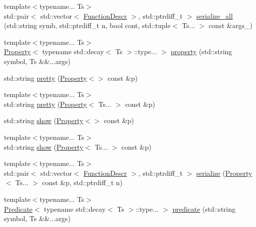 \begin{DoxyCompactItemize}
\item 
{\footnotesize template$<$typename... Ts$>$ }\\std\+::pair$<$ std\+::vector$<$ \hyperlink{structpfq_1_1lang_1_1FunctionDescr}{Function\+Descr} $>$, std\+::ptrdiff\+\_\+t $>$ \hyperlink{namespacepfq_1_1lang_acd7f9c34960d4f3511228a5568628acf}{serialize\+\_\+all} (std\+::string symb, std\+::ptrdiff\+\_\+t n, bool cont, std\+::tuple$<$ Ts... $>$ const \&args\+\_\+)
\item 
{\footnotesize template$<$typename... Ts$>$ }\\\hyperlink{structpfq_1_1lang_1_1Property}{Property}$<$ typename std\+::decay$<$ Ts $>$\+::type... $>$ \hyperlink{namespacepfq_1_1lang_a1249450e72229273b0db707a286aea91}{property} (std\+::string symbol, Ts \&\&...args)
\item 
std\+::string \hyperlink{namespacepfq_1_1lang_ac2521931d090c58e1edaf556692f66d2}{pretty} (\hyperlink{structpfq_1_1lang_1_1Property}{Property}$<$$>$ const \&p)
\item 
{\footnotesize template$<$typename... Ts$>$ }\\std\+::string \hyperlink{namespacepfq_1_1lang_ad72cdee2fca49246a75620232dfe061a}{pretty} (\hyperlink{structpfq_1_1lang_1_1Property}{Property}$<$ Ts... $>$ const \&p)
\item 
std\+::string \hyperlink{namespacepfq_1_1lang_ad0e3d7a27621b981fa381f110ba59db7}{show} (\hyperlink{structpfq_1_1lang_1_1Property}{Property}$<$$>$ const \&p)
\item 
{\footnotesize template$<$typename... Ts$>$ }\\std\+::string \hyperlink{namespacepfq_1_1lang_a94bf1496c888adfd3d99e25895ed6df8}{show} (\hyperlink{structpfq_1_1lang_1_1Property}{Property}$<$ Ts... $>$ const \&p)
\item 
{\footnotesize template$<$typename... Ts$>$ }\\std\+::pair$<$ std\+::vector$<$ \hyperlink{structpfq_1_1lang_1_1FunctionDescr}{Function\+Descr} $>$, std\+::ptrdiff\+\_\+t $>$ \hyperlink{namespacepfq_1_1lang_ac9dfedf649f03709f23fc7ca4afc1679}{serialize} (\hyperlink{structpfq_1_1lang_1_1Property}{Property}$<$ Ts... $>$ const \&p, std\+::ptrdiff\+\_\+t n)
\item 
{\footnotesize template$<$typename... Ts$>$ }\\\hyperlink{structpfq_1_1lang_1_1Predicate}{Predicate}$<$ typename std\+::decay$<$ Ts $>$\+::type... $>$ \hyperlink{namespacepfq_1_1lang_aca9adafc436b7f851621b979fa1aaf88}{predicate} (std\+::string symbol, Ts \&\&...args)

\end{DoxyCompactItemize}
